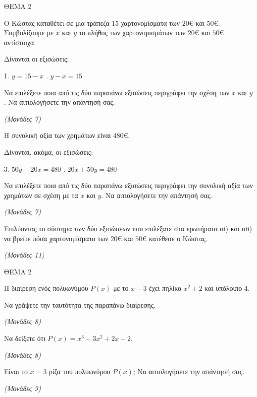\documentclass[11pt,a4paper,twoside]{book}
\newcommand{\monades}[1]{\hfill \textit{(Μονάδες #1)}}
\begin{document}
\vspace{4mm}

ΘΕΜΑ 2

Ο Κώστας καταθέτει σε μια τράπεζα $15$ χαρτονομίσματα των $20$€ και $50$€. Συμβολίζουμε με $x$ και $y$ το πλήθος των χαρτονομισμάτων των $20$€ και $50$€ αντίστοιχα.

\begin{alist}
\item

\begin{rlist}
\item Δίνονται οι εξισώσεις:

1. $y = 15 - x$ . $y - x = 15$

Να επιλέξετε ποια από τις δύο παραπάνω εξισώσεις περιγράφει την σχέση των $x$ και $y$. Να αιτιολογήσετε την απάντησή σας.

\monades{7}

\item Η συνολική αξία των χρημάτων είναι $480$€.

Δίνονται, ακόμα, οι εξισώσεις:

3. $50y - 20x = 480$ . $20x + 50y = 480$

Να επιλέξετε ποια από τις δύο παραπάνω εξισώσεις περιγράφει την συνολική αξία των χρημάτων σε σχέση με τα $x$ και $y$. Να αιτιολογήσετε την απάντησή σας.

\monades{7}

\end{rlist}
\item Επιλύοντας το σύστημα των δύο εξισώσεων που επιλέξατε στα ερωτήματα αi) και αii) να βρείτε πόσα χαρτονομίσματα των $20$€ και $50$€ κατέθεσε ο Κώστας.

\monades{11}
\end{alist}

\vspace{4mm}

ΘΕΜΑ 2

Η διαίρεση ενός πολυωνύμου $P(x)$ με το $x - 3$ έχει πηλίκο $x^2 + 2$ και υπόλοιπο 4.

\begin{alist}
\item Να γράψετε την ταυτότητα της παραπάνω διαίρεσης.

\monades{8}

\item Να δείξετε ότι $P(x) = x^3 - 3x^2 + 2x - 2$.

\monades{8}

\item Είναι το $x = 3$ ρίζα του πολυωνύμου $P(x)$; Να αιτιολογήσετε την απάντησή σας.

\monades{9}
\end{alist}
\end{document}
